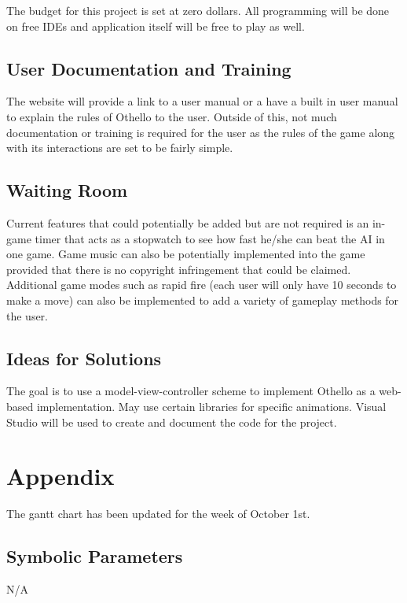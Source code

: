\documentclass[12pt, titlepage]{article}
\begin{document}
The budget for this project is set at zero dollars. All programming will be done on free IDEs and application itself will be free to play as well.

\subsection{User Documentation and Training}

The website will provide a link to a user manual or a have a built in user manual to explain the rules of Othello to the user. Outside of this, not much documentation or training is required for the user as the rules of the game along with its interactions are set to be fairly simple.


\subsection{Waiting Room}

Current features that could potentially be added but are not required is an in-game timer that acts as a stopwatch to see how fast he/she can beat the AI in one game. Game music can also be potentially implemented into the game provided that there is no copyright infringement that could be claimed. Additional game modes such as rapid fire (each user will only have 10 seconds to make a move) can also be implemented to add a variety of gameplay methods for the user.


\subsection{Ideas for Solutions}

The goal is to use a model-view-controller scheme to implement Othello as a web-based implementation. May use certain libraries for specific animations. Visual Studio will be used to create and document the code for the project.





\newpage

\section{Appendix}

The gantt chart has been updated for the week of October 1st.

\subsection{Symbolic Parameters}

N/A
\end{document}
